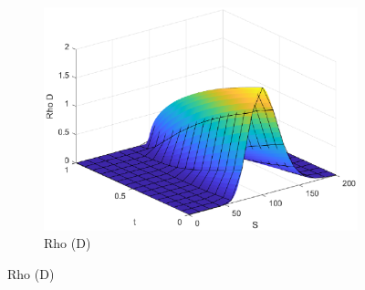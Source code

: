 \begin{figure}[H]
\begin{subfigure}[b]{0.35\linewidth}
        \includegraphics[width=\linewidth]{Imagenes/Parte1/6_Sols/Binary_Call/Binary_Call_Rho_D.eps}
        \caption{Rho (D)}
    \end{subfigure}
\end{figure}


